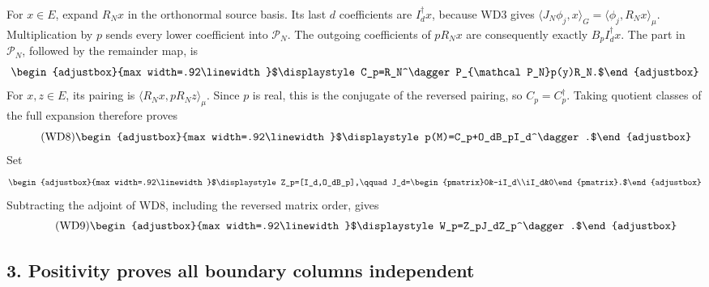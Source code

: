 \documentclass[11pt]{article}
\begin{document}
For \(x\in E\), expand \(R_Nx\) in the orthonormal source basis. Its last \(d\) coefficients are \(I_d^\dagger x\), because WD3 gives \(\langle J_N\phi_j,x\rangle_G=\langle\phi_j,R_Nx\rangle_\mu\). Multiplication by \(p\) sends every lower coefficient into \(\mathcal P_N\). The outgoing coefficients of \(pR_Nx\) are consequently exactly \(B_pI_d^\dagger x\). The part in \(\mathcal P_N\), followed by the remainder map, is 
\begin{equation*}
\begin{adjustbox}{max width=.92\linewidth}$\displaystyle C_p=R_N^\dagger P_{\mathcal P_N}p(y)R_N.$\end{adjustbox}
\end{equation*}
 For \(x,z\in E\), its pairing is \(\langle R_Nx,pR_Nz\rangle_\mu\). Since \(p\) is real, this is the conjugate of the reversed pairing, so \(C_p=C_p^\dagger\). Taking quotient classes of the full expansion therefore proves 
\begin{equation*}
\tag{WD8}
\begin{adjustbox}{max width=.92\linewidth}$\displaystyle p(M)=C_p+O_dB_pI_d^\dagger.$\end{adjustbox}
\end{equation*}
 Set 
\begin{equation*}
\begin{adjustbox}{max width=.92\linewidth}$\displaystyle Z_p=[I_d,O_dB_p],\qquad
 J_d=\begin{pmatrix}0&-iI_d\\iI_d&0\end{pmatrix}.$\end{adjustbox}
\end{equation*}
 Subtracting the adjoint of WD8, including the reversed matrix order, gives 
\begin{equation*}
\tag{WD9}
\begin{adjustbox}{max width=.92\linewidth}$\displaystyle W_p=Z_pJ_dZ_p^\dagger.$\end{adjustbox}
\end{equation*}


\subsection{3. Positivity proves all boundary columns independent}\label{part2-positivity-proves-all-boundary-columns-independent}
\end{document}
